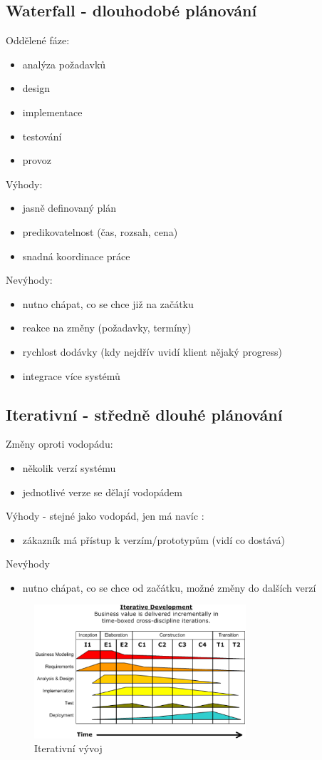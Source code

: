 \documentclass{szzclass}
\begin{document}
\subsection{Waterfall - dlouhodobé plánování}
Oddělené fáze:
\begin{itemize}
    \item analýza požadavků
    \item design
    \item implementace
    \item testování
    \item provoz
\end{itemize}
Výhody:
\begin{itemize}
    \item jasně definovaný plán
    \item predikovatelnost (čas, rozsah, cena)
    \item snadná koordinace práce
\end{itemize}
\newpage
Nevýhody:
\begin{itemize}
    \item nutno chápat, co se chce již na začátku
    \item reakce na změny (požadavky, termíny)
    \item rychlost dodávky (kdy nejdřív uvidí klient nějaký progress)
    \item integrace více systémů
\end{itemize}
\subsection{Iterativní - středně dlouhé plánování}
Změny oproti vodopádu:
\begin{itemize}
    \item několik verzí systému
    \item jednotlivé verze se dělají vodopádem
\end{itemize}
Výhody - stejné jako vodopád, jen má navíc :
\begin{itemize}
    \item zákazník má přístup k verzím/prototypům (vidí co dostává)
\end{itemize}
Nevýhody
\begin{itemize}
    \item nutno chápat, co se chce od začátku, možné změny do dalších verzí
\end{itemize}
\begin{figure}[h!]
    \centering
    \includegraphics[width=0.7\textwidth]{topics/bi-wsi-si-24/images/iterativeDevelopment.png}
    \caption{Iterativní vývoj}
\end{figure}
\end{document}
